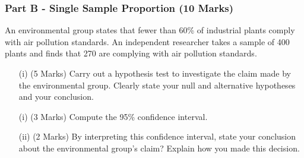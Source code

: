 \documentclass[a4paper,12pt]{article}
\begin{document}
\subsubsection*{Part B  - Single Sample Proportion (10 Marks)}
An environmental group states that fewer than 60\% of industrial plants comply with air pollution standards. An independent researcher takes a sample of 400 plants and finds that 270 are complying with air pollution standards. 
\begin{itemize}
	\item[(i)] (5 Marks) Carry out a hypothesis test to investigate the claim made by the environmental group. Clearly state your null and alternative hypotheses and your conclusion.
	\item[(i)](3 Marks) Compute the 95\% confidence interval.
	\item[(ii)](2 Marks) By interpreting this confidence interval, state your conclusion about the environmental group's claim? Explain how you made this decision.
\end{itemize}

%
\end{document}
